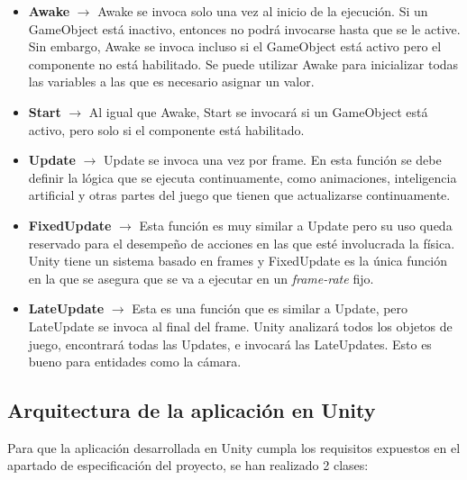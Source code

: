 \begin {itemize}
\item \textbf{Awake} $\rightarrow$  Awake se invoca solo una vez al inicio de la ejecuci\'on. Si un GameObject est\'a inactivo, entonces no podr\'a invocarse hasta que se le active. Sin embargo, Awake se invoca incluso si el GameObject est\'a activo pero el componente no est\'a habilitado. Se puede utilizar Awake para inicializar todas las variables a las que es necesario asignar un valor.
\item \textbf{Start} $\rightarrow$ Al igual que Awake, Start se invocar\'a si un GameObject est\'a activo, pero solo si el componente est\'a habilitado.
\item \textbf{Update} $\rightarrow$ Update se invoca una vez por frame. En esta funci\'on se debe definir la l\'ogica que se ejecuta continuamente, como animaciones, inteligencia artificial y otras partes del juego que tienen que actualizarse continuamente.
\item \textbf{FixedUpdate} $\rightarrow$ Esta funci\'on es muy similar a Update pero su uso queda reservado para el desempe\~no de acciones en las que est\'e involucrada la f\'isica. Unity tiene un sistema basado en frames y FixedUpdate es la \'unica funci\'on en la que se asegura que se va a ejecutar en un \textit{frame-rate} fijo. 
\item \textbf{LateUpdate} $\rightarrow$ Esta es una funci\'on que es similar a Update, pero LateUpdate se invoca al final del frame. Unity analizar\'a todos los objetos de juego, encontrar\'a todas las Updates, e invocar\'a las LateUpdates. Esto es bueno para entidades como la c\'amara.
\end {itemize}

\subsection {Arquitectura de la aplicaci\'on en Unity}

Para que la aplicaci\'on desarrollada en Unity cumpla los requisitos expuestos en el apartado de especificaci\'on del proyecto, se han realizado 2 clases:

